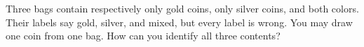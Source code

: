 Three bags contain respectively only gold coins, only silver coins, and both colors. Their labels say gold, silver, and mixed, but every label is wrong. You may draw one coin from one bag. How can you identify all three contents?
